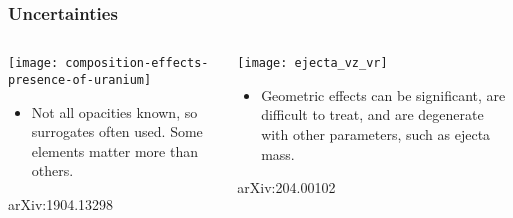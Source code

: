 \documentclass[]{beamer}
\newcommand{\backupend}{
   \setcounter{framenumber}{\value{finalframe}}
}
\begin{document}
\begin{frame}
  \frametitle{Uncertainties}
  \begin{columns}
    \begin{column}{6cm}
      \begin{center}
        \texttt{[image: composition-effects-presence-of-uranium]}
      \end{center}
      \begin{itemize}
      \item Not all opacities known, so surrogates often used. Some
        elements matter more than others.
      \end{itemize}
      {\footnotesize arXiv:1904.13298}
    \end{column}
    \begin{column}{6cm}
      \begin{center}
        \texttt{[image: ejecta\_vz\_vr]}
      \end{center}
      \begin{itemize}
      \item Geometric effects can be significant, are difficult to
        treat, and are degenerate with other parameters, such as
        ejecta mass.
      \end{itemize}
      {\footnotesize arXiv:204.00102}
    \end{column}
  \end{columns}
\end{frame}


\backupend
\end{document}
